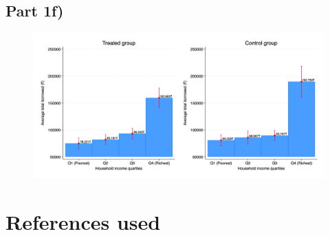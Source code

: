 \documentclass[12pt]{article}
\begin{document}
\begin{landscape}
    


\subsection*{Part 1f)}

\begin{figure}[H]
    \centering
    \includegraphics[width=\textwidth]{figures/figure03_loansbar.png}
\end{figure}

\end{landscape}
\section{References used}
\end{document}

